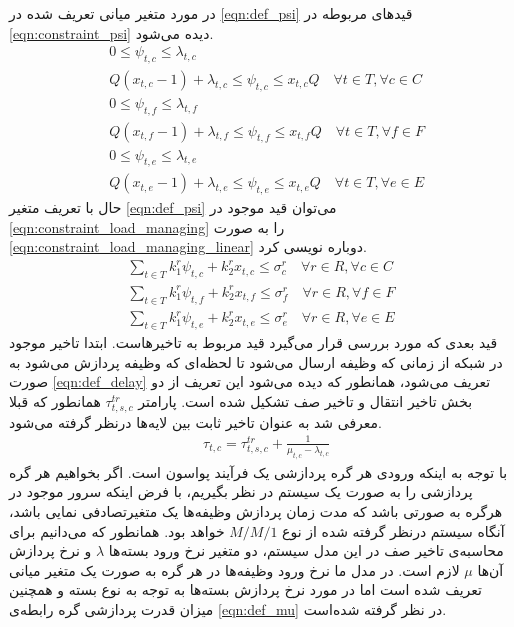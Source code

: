 	
	در مورد متغیر میانی تعریف شده در \cref{eqn:def_psi} قیدهای مربوطه در \cref{eqn:constraint_psi} دیده می‌شود. 
	\begin{subequations}\label{eqn:constraint_psi}
		\begin{align}
		&0 \leq \psi_{t,c} \leq \lambda_{t,c} \\
		&Q(x_{t,c}-1)+\lambda_{t,c} \leq \psi_{t,c} \leq x_{t,c}Q \quad \forall{t\in T}, \forall{c \in C} \\
		&0 \leq \psi_{t,f} \leq \lambda_{t,f} \\
		&Q(x_{t,f}-1)+\lambda_{t,f} \leq \psi_{t,f} \leq x_{t,f}Q \quad \forall{t \in T}, \forall{f \in F} \\
		&0 \leq \psi_{t,e} \leq \lambda_{t,e} \\
		&Q(x_{t,e}-1)+\lambda_{t,e} \leq \psi_{t,e} \leq x_{t,e}Q \quad \forall{t \in T}, \forall{e \in E}
		\end{align}
	\end{subequations}
	حال با تعریف متغیر \cref{eqn:def_psi} می‌توان قید موجود در \cref{eqn:constraint_load_managing} را به صورت \cref{eqn:constraint_load_managing_linear} دوباره نویسی کرد. 
	\begin{subequations}\label{eqn:constraint_load_managing_linear}
		\begin{align}
		\sum_{t \in T}k_1^r\psi_{t,c}+k_2^rx_{t,c} \le \sigma_c^r \quad \forall{r \in R}, \forall{c \in C} \\
		\sum_{t \in T}k_1^r\psi_{t,f}+k_2^rx_{t,f} \le \sigma_f^r \quad \forall{r \in R}, \forall{f \in F} \\
		\sum_{t \in T}k_1^r\psi_{t,e}+k_2^rx_{t,e} \le \sigma_e^r \quad \forall{r \in R}, \forall{e \in E}
		\end{align}
	\end{subequations}
	قید بعدی که مورد بررسی قرار می‌گیرد قید مربوط به تاخیرهاست. ابتدا تاخیر موجود در شبکه از زمانی که وظیفه ارسال می‌شود تا لحظه‌ای که وظیفه پردازش می‌شود به صورت \cref{eqn:def_delay} تعریف می‌شود، همانطور که دیده می‌شود این تعریف از دو بخش تاخیر انتقال و تاخیر صف تشکیل شده است. پارامتر $\tau_{t,s,c}^{tr}$ همانطور که قبلا معرفی شد به عنوان تاخیر ثابت بین لایه‌ها درنظر گرفته می‌شود. 
	\begin{align}
		&\tau_{t,c} = \tau_{t,s,c}^{tr} + \frac{1}{\mu_{t,c}-\lambda_{t,c}} \label{eqn:def_delay}
	\end{align}
با توجه به اینکه ورودی هر گره پردازشی یک فرآیند پواسون است. اگر بخواهیم هر گره پردازشی را به صورت یک سیستم در نظر بگیریم، با فرض اینکه سرور موجود در هرگره به صورتی باشد که مدت زمان پردازش وظیفه‌ها یک متغیرتصادفی نمایی باشد، آنگاه سیستم درنظر گرفته شده از نوع $M/M/1$ خواهد بود. همانطور که می‌دانیم برای محاسبه‌ی تاخیر صف در این مدل سیستم، دو متغیر نرخ ورود بسته‌ها $\lambda$ و نرخ پردازش آن‌ها $\mu$ لازم است. در مدل ما نرخ ورود وظیفه‌ها در هر گره به صورت یک متغیر میانی تعریف شده است اما در مورد نرخ پردازش بسته‌ها به توجه به نوع بسته و همچنین میزان قدرت پردازشی گره رابطه‌ی \cref{eqn:def_mu} در نظر گرفته شده‌است.
